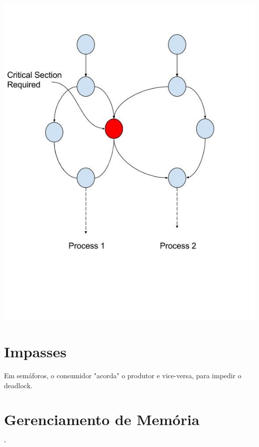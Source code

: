 \documentclass[ ]{article}
\begin{document}
		\includegraphics[scale=0.8]{images/critical_section.jpg}
	\section{Impasses}
	
		Em semáforos, o consumidor "acorda" o produtor e vice-versa, para impedir o deadlock.
	\section{Gerenciamento de Memória}'
\end{document}
